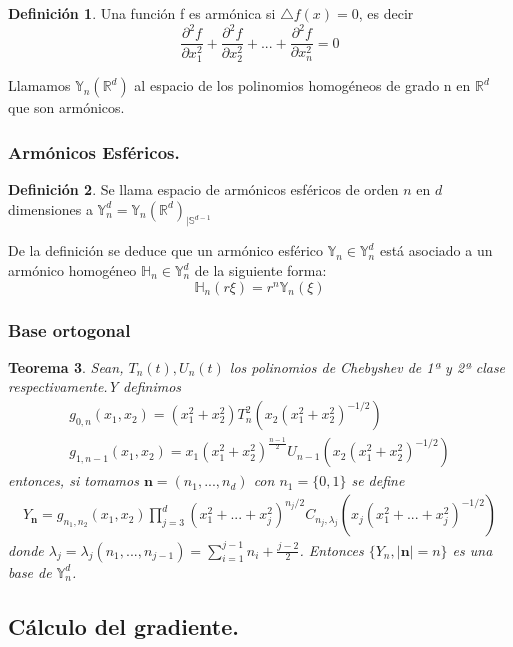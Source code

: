 \documentclass{beamer}
\theoremstyle{plain}
\newtheorem{thm}{Teorema}
\theoremstyle{definition}
\newtheorem{defn}[thm]{Definici\'{o}n}
\theoremstyle{plain}
\theoremstyle{definition}
\theoremstyle{remark}
\theoremstyle{definition}
\begin{document}
\begin{frame}
	\begin{defn}
		Una función f es armónica si $\triangle f (x) = 0$, es decir $$\frac{\partial^2 f}{\partial x_1^2}+\frac{\partial^2 f}{\partial x_2^2}+...+\frac{\partial^2 f}{\partial x_n^2} = 0$$
	\end{defn}

	Llamamos $\mathds{Y}_n(\mathds{R}^d)$ al espacio de los polinomios homogéneos de grado n en $\mathds{R}^d$ que son armónicos.

\end{frame}
\begin{frame}
	\frametitle{Armónicos Esféricos.}
	\begin{defn}
		Se llama espacio de armónicos esféricos de orden $n$ en $d$ dimensiones a	$\mathds{Y}^d_n = \mathds{Y}_n(\mathds{R}^d)_{|\mathds{S}^{d-1}}$ 
	\end{defn}
	De la definición se deduce que un armónico esférico $\mathds{Y}_n \in \mathds{Y}^d_n$ está asociado a un armónico homogéneo $\mathds{H}_n \in \mathds{Y}^d_n$ de la siguiente forma:
	$$
	\mathds{H}_n(r\xi) = r^n\mathds{Y}_n(\xi)
	$$
\end{frame}
\begin{frame}
	\frametitle{Base ortogonal}
	\begin{thm}
		Sean, $T_{n}(t),U_{n}(t)$ los polinomios de Chebyshev de 1ª y 2ª clase respectivamente.Y definimos
		\begin{gather*}
		g_{0,n}(x_1,x_2) = (x_1^2+x_2^2)T_n^2(x_2(x_1^2+x_2^2)^{-1/2})
		\\
		g_{1,n-1}(x_1,x_2) = x_1(x_1^2+x_2^2)^{\frac{n-1}{2}}U_{n-1}(x_2(x_1^2+x_2^2)^{-1/2})
		\end{gather*}
		entonces, si tomamos $\textbf{n}=(n_1,...,n_d)$ con $n_1 = \{0,1\}$ se define
		\begin{gather*}
		Y_{\textbf{n}}=g_{n_1,n_2}(x_1,x_2)\prod_{j=3}^{d}(x_1^2+...+x_j^2)^{n_j/2}C_{n_j,\lambda_j}(x_j(x_1^2+...+x_j^2)^{-1/2})
		\end{gather*}
		donde $\lambda_j =\lambda_j(n_1,...,n_{j-1}) = \sum_{i=1}^{j-1}n_i + \frac{j-2}{2}$. Entonces $\{Y_n,|\textbf{n}|=n\}$ es una base de $\mathds{Y}_{n}^{d}$.
	\end{thm}
\end{frame}
\subsection{Cálculo del gradiente.}
\begin{frame}
\end{frame}
\end{document}
